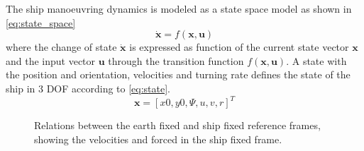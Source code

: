 The ship manoeuvring dynamics is modeled as a state space model as shown in \autoref{eq:state_space}
\begin{equation}
    \dot{\mathbf{x}}=f(\mathbf{x},\mathbf{u})
    \label{eq:state_space}
\end{equation}
where the change of state $\dot{\mathbf{x}}$ is expressed as function of the current state vector $\mathbf{x}$ and the input vector $\mathbf{u}$ through the transition function $f(\mathbf{x},\mathbf{u})$. A state with the position and orientation, velocities and turning rate defines the state of the ship in 3 DOF according to \autoref{eq:state}. 
\begin{equation}
    \mathbf{x} = [x0,y0,\Psi, u,v,r]^T
    \label{eq:state}
\end{equation}
\begin{figure}[h]
    \centering
    
    \caption{Relations between the earth fixed and ship fixed reference frames, showing the velocities and forced in the ship fixed frame.}
    \label{fig:reference_frames}
\end{figure}

